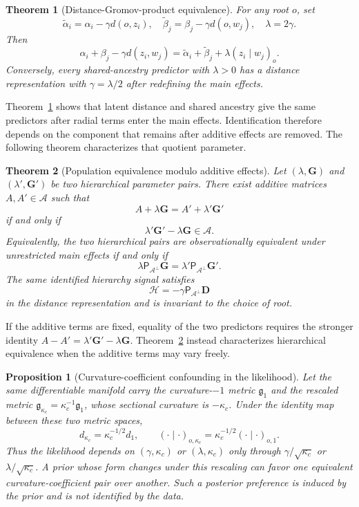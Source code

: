 \documentclass[
  12pt]{article}
\newtheorem{theorem}{Theorem}[section]
\newtheorem{proposition}{Proposition}[section]
\theoremstyle{definition}
\theoremstyle{plain}
\newcommand{\calA}{\mathcal A}
\newcommand{\projA}{\mathsf P_{\calA^\perp}}
\newcommand{\bD}{\mathbf D}
\newcommand{\bG}{\mathbf G}
\begin{document}
\begin{theorem}[Distance-Gromov-product equivalence]
\label{thm:equivalence}
For any root $o$, set
\[
\widetilde\alpha_i=\alpha_i-\gamma d(o,z_i),
\quad
\widetilde\beta_j=\beta_j-\gamma d(o,w_j),
\quad
\lambda=2\gamma.
\]
Then
\[
\alpha_i+\beta_j-\gamma d(z_i,w_j)
=
\widetilde\alpha_i+\widetilde\beta_j+\lambda(z_i\mid w_j)_o.
\]
Conversely, every shared-ancestry predictor with $\lambda>0$ has a distance representation with $\gamma=\lambda/2$ after redefining the main effects.
\end{theorem}

Theorem~\ref{thm:equivalence} shows that latent distance and shared ancestry give the same predictors after radial terms enter the main effects. Identification therefore depends on the component that remains after additive effects are removed. The following theorem characterizes that quotient parameter.

\begin{theorem}[Population equivalence modulo additive effects]
\label{thm:population}
Let $(\lambda,\bG)$ and $(\lambda',\bG')$ be two hierarchical parameter pairs. There exist additive matrices $A,A'\in\calA$ such that
\[
A+\lambda\bG=A'+\lambda'\bG'
\]
if and only if
\[
\lambda'\bG'-\lambda\bG\in\calA.
\]
Equivalently, the two hierarchical pairs are observationally equivalent under unrestricted main effects if and only if
\[
\lambda\projA\bG=\lambda'\projA\bG'.
\]
The same identified hierarchy signal satisfies
\[
\mathcal H=-\gamma\projA\bD
\]
in the distance representation and is invariant to the choice of root.
\end{theorem}

If the additive terms are fixed, equality of the two predictors requires the stronger identity $A-A'=\lambda'\bG'-\lambda\bG$. Theorem~\ref{thm:population} instead characterizes hierarchical equivalence when the additive terms may vary freely.



\begin{proposition}[Curvature-coefficient confounding in the likelihood]
\label{prop:curvature}
Let the same differentiable manifold carry the curvature-$-1$ metric $\mathfrak g_1$ and the rescaled metric $\mathfrak g_{\kappa_c}=\kappa_c^{-1}\mathfrak g_1$, whose sectional curvature is $-\kappa_c$. Under the identity map between these two metric spaces,
\[
d_{\kappa_c}=\kappa_c^{-1/2}d_1,
\qquad
(\cdot\mid\cdot)_{o,\kappa_c}=\kappa_c^{-1/2}(\cdot\mid\cdot)_{o,1}.
\]
Thus the likelihood depends on $(\gamma,\kappa_c)$ or $(\lambda,\kappa_c)$ only through $\gamma/\sqrt{\kappa_c}$ or $\lambda/\sqrt{\kappa_c}$. A prior whose form changes under this rescaling can favor one equivalent curvature-coefficient pair over another. Such a posterior preference is induced by the prior and is not identified by the data.
\end{proposition}
\end{document}
